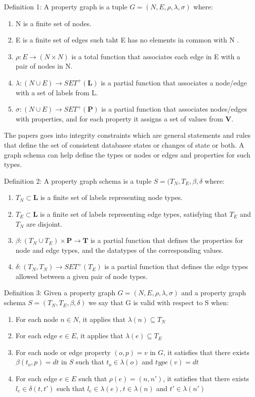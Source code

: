 Definition 1: A property graph is a tuple $G = (N,E,\rho,\lambda,\sigma)$ where: 
\begin{enumerate}
    \item N is a finite set of nodes.
    \item E is a finite set of edges such taht E has no elements in common with N .
    \item $\rho : E \rightarrow (N \times N)$ is a total function that associates each edge in E with a pair of nodes in N.
    \item $\lambda : (N \cup E) \rightarrow SET^+(\boldsymbol{L})$ is a partial function that associates a node/edge with a set of labels from L. 
    \item $\sigma : (N \cup E) \rightarrow SET^+(\boldsymbol{P})$ is a partial function that associates nodes/edges with properties, and for each property it assigns a set of values from $\boldsymbol{V}$.
\end{enumerate}

The papers goes into integrity constraints which are general statements and rules that define the set of consistent databasee states or changes of state or both. A graph schema can help define the types or nodes or edges and properties for such types. 

Definition 2: A property graph schema is a tuple $S = (T_N, T_E, \beta, \delta$ where: 
\begin{enumerate}
    \item $T_N \subset \boldsymbol{L}$ is a finite set of labels representing node types.
    \item $T_E \subset \boldsymbol{L}$ is a finite set of labels representing edge types, satisfying that $T_E$ and $T_N$ are disjoint.
    \item $\beta : (T_N \cup T_E) \times \boldsymbol{P} \rightarrow \boldsymbol{T}$ is a partial function that defines the properties for node and edge types, and the datatypes of the corresponding values.
    \item $\delta : (T_N, T_N) \rightarrow SET^+(T_E)$ is a partial function that defines the edge types allowed between a given pair of node types. 
\end{enumerate}

Definition 3: Given a property graph $G = (N,E,\rho,\lambda,\sigma)$ and a property graph schema $S = (T_N,T_E,\beta,\delta)$ we say that G is valid with respect to S when: 
\begin{enumerate}
    \item For each node $n \in N$, it applies that $\lambda(n) \subseteq T_N$
    \item For each edge $e \in E$, it applies that $\lambda(e) \subseteq T_E$
    \item For each node or edge property $(o,p) = v$ in $G$, it satisfies that there exists $\beta(t_o,p) = dt$ in $S$ such that $t_o \in \lambda(o)$ and $type(v) = dt$
    \item For each edge $e \in E$ such that $\rho(e) = (n,n')$, it satisfies that there exists $l_e \in \delta(t,t')$ such that $l_e \in \lambda(e), t \in \lambda(n)$ and $t' \in \lambda(n')$
\end{enumerate}

